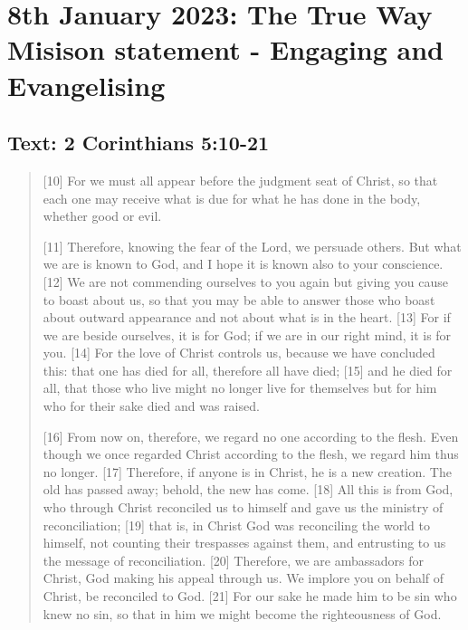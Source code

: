 \section{8th January 2023: The True Way Misison statement - Engaging and Evangelising}
\subsection*{Text: 2 Corinthians 5:10-21}
  \begin{quote}
    [10] For we must all appear before the judgment seat of Christ, so that
    each one may receive what is due for what he has done in the body,
    whether good or evil.

    [11] Therefore, knowing the fear of the Lord, we persuade others.  But
    what we are is known to God, and I hope it is known also to your
    conscience.  [12] We are not commending ourselves to you again but giving
    you cause to boast about us, so that you may be able to answer those who
    boast about outward appearance and not about what is in the heart.  [13]
    For if we are beside ourselves, it is for God; if we are in our right
    mind, it is for you.  [14] For the love of Christ controls us, because we
    have concluded this: that one has died for all, therefore all have died;
    [15] and he died for all, that those who live might no longer live for
    themselves but for him who for their sake died and was raised.

    [16] From now on, therefore, we regard no one according to the flesh.
    Even though we once regarded Christ according to the flesh, we regard him
    thus no longer.  [17] Therefore, if anyone is in Christ, he is a new
    creation.  The old has passed away; behold, the new has come.  [18] All
    this is from God, who through Christ reconciled us to himself and gave us
    the ministry of reconciliation; [19] that is, in Christ God was
    reconciling the world to himself, not counting their trespasses against
    them, and entrusting to us the message of reconciliation.  [20]
    Therefore, we are ambassadors for Christ, God making his appeal through
    us.  We implore you on behalf of Christ, be reconciled to God.  [21] For
    our sake he made him to be sin who knew no sin, so that in him we might
    become the righteousness of God.
  \end{quote}
